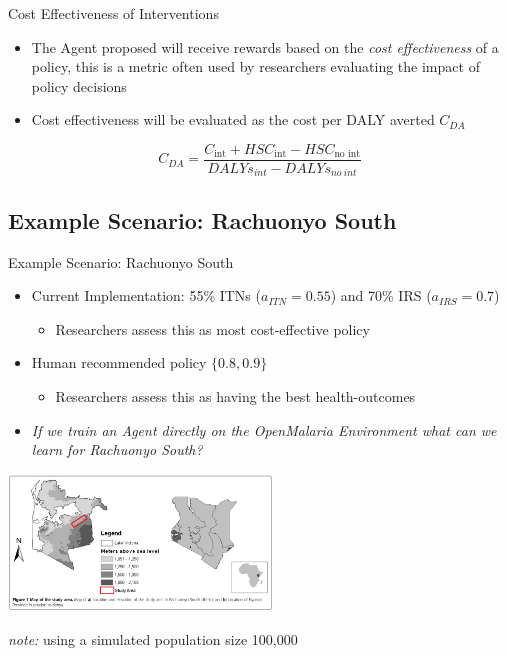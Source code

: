 \documentclass{beamer}
\begin{document}

\begin{frame}{Cost Effectiveness of Interventions}

\begin{itemize}
\item The Agent proposed will receive rewards based on the \textit{cost effectiveness} of a policy, this is a metric often used by researchers evaluating the impact of policy decisions
\item  Cost effectiveness will be evaluated as the cost per DALY averted $C_{DA}$
\end{itemize}

\begin{equation}
C_{DA} =\dfrac{C_{\mbox{int}} + HSC_{\mbox{int}}-HSC_{\mbox{no~int}}}{DALYs_{int}-DALYs_{no~int}} 
\end{equation}


\end{frame}


\subsection{Example Scenario: Rachuonyo South }

\begin{frame}{Example Scenario: Rachuonyo South}

\begin{itemize}
\item Current Implementation: 55\% ITNs ($a_{ITN} = 0.55$) and 70\% IRS ($a_{IRS} = 0.7$) 
	\begin{itemize}
	\item Researchers assess this as most cost-effective policy
	\end{itemize}
\item Human recommended policy $\{0.8,0.9\}$
	\begin{itemize}
	\item Researchers assess this as having the best health-outcomes
	\end{itemize}
\item \textit{If we train an Agent directly on the OpenMalaria Environment what can we learn for Rachuonyo South?}
\end{itemize}
\centering
         \includegraphics[width=7cm]{images/WesternKenya.png} 
         
\textit{note:} using a simulated population size 100,000
\end{frame}
\end{document}
